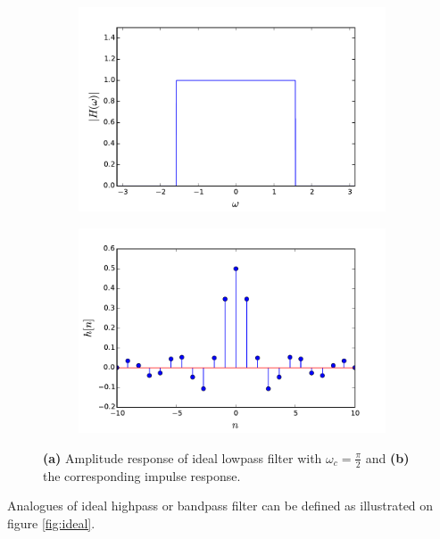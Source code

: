 \begin{figure}[H]
\begin{subfigure}[b]{0.50\textwidth}
        \centering
\includegraphics[scale=0.45]{figures/filter_teori/ideal_low2.pdf}
\caption{}
\end{subfigure}
\begin{subfigure}[b]{0.50\textwidth}
        \centering  
\includegraphics[scale=0.45]{figures/filter_teori/ideal_low1.pdf}
\caption{}
 \end{subfigure}
\caption{\textbf{(a)} Amplitude response of ideal lowpass filter with $\omega_c = \frac{\pi}{2}$ and \textbf{(b)} the corresponding impulse response.}
\label{fig:ideal_low}
\end{figure}

Analogues of ideal highpass or bandpass filter can be defined as illustrated on figure \ref{fig:ideal}.

